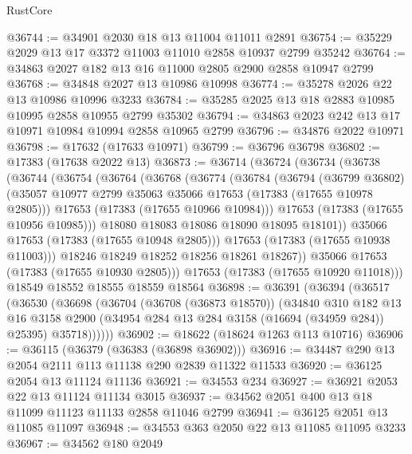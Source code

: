 \begin{lexlean}{RustCore}
\begin{coremodule}
@36744 := @34901 @2030 @18 @13 @11004 @11011 @2891
@36754 := @35229 @2029 @13 @17 @3372 @11003 @11010 @2858 @10937 @2799 @35242
@36764 := @34863 @2027 @182 @13 @16 @11000 @2805 @2900 @2858 @10947 @2799
@36768 := @34848 @2027 @13 @10986 @10998
@36774 := @35278 @2026 @22 @13 @10986 @10996 @3233
@36784 := @35285 @2025 @13 @18 @2883 @10985 @10995 @2858 @10955 @2799 @35302
@36794 := @34863 @2023 @242 @13 @17 @10971 @10984 @10994 @2858 @10965 @2799
@36796 := @34876 @2022 @10971
@36798 := @17632 (@17633 @10971)
@36799 := @36796 @36798
@36802 := @17383 (@17638 @2022 @13)
@36873 := @36714
    (@36724
      (@36734
        (@36738
          (@36744
            (@36754
              (@36764
                (@36768
                  (@36774
                    (@36784
                      (@36794
                        (@36799 @36802)
                        (@35057 @10977 @2799 @35063 @35066 @17653 (@17383 (@17655 @10978 @2805)))
                        @17653
                        (@17383 (@17655 @10966 @10984)))
                      @17653
                      (@17383 (@17655 @10956 @10985)))
                    @18080
                    @18083
                    @18086
                    @18090
                    @18095
                    @18101))
                @35066
                @17653
                (@17383 (@17655 @10948 @2805)))
              @17653
              (@17383 (@17655 @10938 @11003)))
            @18246
            @18249
            @18252
            @18256
            @18261
            @18267))
        @35066
        @17653
        (@17383 (@17655 @10930 @2805)))
      @17653
      (@17383 (@17655 @10920 @11018)))
    @18549
    @18552
    @18555
    @18559
    @18564
@36898 := @36391
    (@36394
      (@36517
        (@36530
          (@36698
            (@36704
              (@36708 (@36873 @18570))
              (@34840
                @310
                @182
                @13
                @16
                @3158
                @2900
                (@34954 @284 @13 @284 @3158 (@16694 (@34959 @284)) @25395)
                @35718))))))
@36902 := @18622 (@18624 @1263 @113 @10716)
@36906 := @36115 (@36379 (@36383 (@36898 @36902)))
@36916 := @34487 @290 @13 @2054 @2111 @113 @11138 @290 @2839 @11322 @11533
@36920 := @36125 @2054 @13 @11124 @11136
@36921 := @34553 @234
@36927 := @36921 @2053 @22 @13 @11124 @11134 @3015
@36937 := @34562 @2051 @400 @13 @18 @11099 @11123 @11133 @2858 @11046 @2799
@36941 := @36125 @2051 @13 @11085 @11097
@36948 := @34553 @363 @2050 @22 @13 @11085 @11095 @3233
@36967 := @34562
    @180
    @2049

\end{coremodule}
\end{lexlean}
